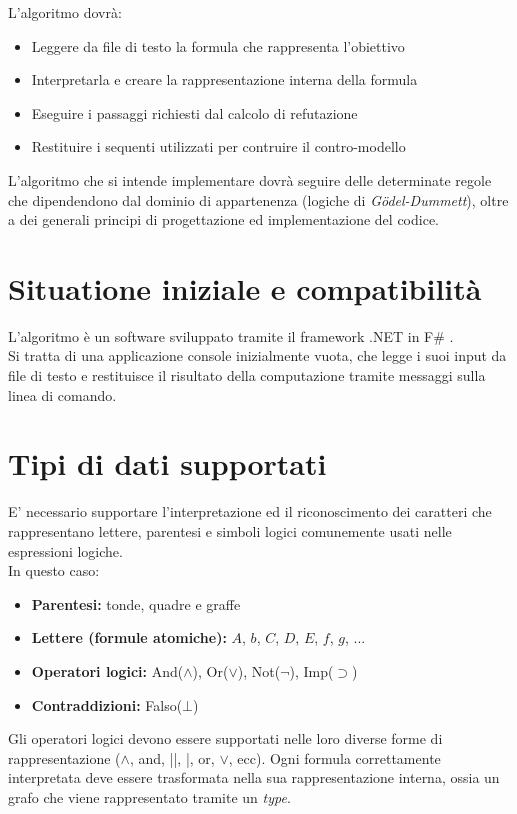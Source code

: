 \documentclass[\main/tesi.tex]{subfiles}
\begin{document}
\newpage

L'algoritmo dovrà:
\begin{itemize}
  \item Leggere da file di testo la formula che rappresenta l'obiettivo
  \item Interpretarla e creare la rappresentazione interna della formula
  \item Eseguire i passaggi richiesti dal calcolo di refutazione
  \item Restituire i sequenti utilizzati per contruire il contro-modello
\end{itemize}
L'algoritmo che si intende implementare dovrà seguire delle determinate regole che dipendendono dal dominio di appartenenza (logiche di \textit{G\"odel-Dummett}), oltre a dei generali principi di progettazione ed implementazione del codice.

\section{Situatione iniziale e compatibilità}

L'algoritmo è un software sviluppato tramite il framework .NET \cite{dotnet} in F\# \cite{fsharp}. \\
Si tratta di una applicazione console inizialmente vuota, che legge i suoi input da file di testo e restituisce il risultato della computazione tramite messaggi sulla linea di comando. \\

\section{Tipi di dati supportati}
E' necessario supportare l'interpretazione ed il riconoscimento dei caratteri che rappresentano lettere, parentesi e simboli logici comunemente usati nelle espressioni logiche. \\
In questo caso:
\begin{itemize}
  \item \textbf{Parentesi:} tonde, quadre e graffe
  \item \textbf{Lettere (formule atomiche):} $A$, $b$, $C$, $D$, $E$, $f$, $g$, ...
  \item \textbf{Operatori logici:} And($\land$), Or($\lor$), Not($\neg$), Imp($\supset$)
  \item \textbf{Contraddizioni:} Falso($\bot$)
\end{itemize}
Gli operatori logici devono essere supportati nelle loro diverse forme di rappresentazione ($\land$, and, ||, |, or, $\lor$, ecc).
Ogni formula correttamente interpretata deve essere trasformata nella sua rappresentazione interna, ossia un grafo che viene rappresentato tramite un \textit{type}. \\
\end{document}
